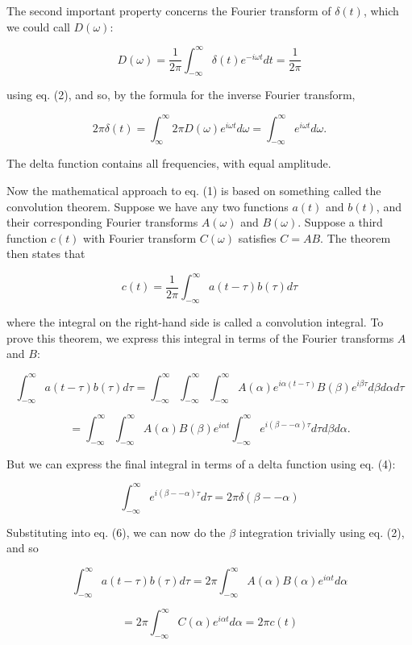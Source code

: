   The second important property concerns the Fourier transform of $\delta(t)$, 
  which we could call $D(\omega)$: 

  $$D(\omega)=\dfrac{1}{2 \pi} \int_{-\infty}^{\infty}{\delta(t) e^{-i \omega 
  t} dt} =\dfrac{1}{2 \pi} \tag{3}$$ 

  using eq. (2), and so, by the formula for the inverse Fourier transform, 

  $$2 \pi \delta(t)=\int_{\infty}^{\infty}{2 \pi D(\omega) e^{i \omega t} d 
  \omega} =\int_{-\infty}^{\infty}{e^{i \omega t} d \omega} . \tag{4}$$ 

  The delta function contains all frequencies, with equal amplitude. 

  Now the mathematical approach to eq. (1) is based on something called the 
  convolution theorem. Suppose we have any two functions $a(t)$ and $b(t)$, and 
  their corresponding Fourier transforms $A(\omega)$ and $B(\omega)$. Suppose a 
  third function $c(t)$ with Fourier transform $C(\omega)$ satisfies $C=AB$. 
  The theorem then states that 

  $$c(t)= \dfrac{1}{2 \pi} \int_{-\infty}^{\infty}{a(t-\tau) b(\tau) d \tau} 
  \tag{5}$$ 

  where the integral on the right-hand side is called a convolution integral. 
  To prove this theorem, we express this integral in terms of the Fourier 
  transforms $A$ and $B$: 

  $$\int_{-\infty}^{\infty}{a(t-\tau) b(\tau) d 
  \tau}=\int_{-\infty}^{\infty}{\int_{-\infty}^{\infty}{\int_{-\infty}^{\infty}{A(\alpha) 
  e^{i \alpha (t-\tau)} B(\beta) e^{i \beta \tau} d \beta} d \alpha } d \tau}$$ 

  $$=\int_{-\infty}^{\infty}{\int_{-\infty}^{\infty}{A(\alpha) B(\beta) e^{i 
  \alpha t} \int_{-\infty}^{\infty}{e^{i (\beta -- \alpha) \tau} d \tau} d 
  \beta} d \alpha }. \tag{6}$$ 

  But we can express the final integral in terms of a delta function using eq. 
  (4): 

  $$\int_{-\infty}^{\infty}{e^{i (\beta -- \alpha) \tau} d \tau} = 2 \pi \delta 
  (\beta -- \alpha) \tag{7}$$ 

  Substituting into eq. (6), we can now do the $\beta$ integration trivially 
  using eq. (2), and so 

  $$\int_{-\infty}^{\infty}{a(t-\tau) b(\tau) d \tau}=2 
  \pi\int_{-\infty}^{\infty}{A(\alpha) B(\alpha) e^{i \alpha t} d \alpha}$$ 

  $$=2 \pi \int_{-\infty}^{\infty}{C(\alpha) e^{i \alpha t} d \alpha} =2 \pi 
  c(t) \tag{8}$$ 

